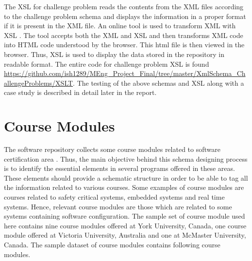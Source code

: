 \documentclass[11pt,letterpaper]{report}
\begin{document}
The XSL for challenge problem reads the contents from the XML files according to the challenge problem schema and displays the information in a proper format if it is present in the XML file. An online tool is used to transform XML with XSL \cite{olXSL}. The tool accepts both the XML and XSL and then transforms XML code into HTML code understood by the browser. This html file is then viewed in the browser. Thus, XSL is used to display the data stored in the repository in readable format. The entire code for challenge problem XSL is found \url{https://github.com/ish1289/MEng_Project_Final/tree/master/XmlSchema_ChallengeProblems/XSLT}.
The testing of the above schemas and XSL along with a case study is described in detail later in the report. 

\chapter{Course Modules}
The software repository collects some course modules related to software certification area \cite{York,Waterloo, MaC,Victoria}. Thus, the main objective behind this schema designing process is to identify the essential elements in several programs offered in these areas. These elements should provide a schematic structure in order to be able to tag all the information related to various courses. Some examples of course modules are courses related to safety critical systems, embedded systems and real time systems. Hence, relevant course modules are those which are related to some systems containing software configuration. The sample set of course module used here contains nine course modules offered at York University, Canada, one course module offered at Victoria University, Australia and one at McMaster University, Canada. The sample dataset of course modules contains following course modules. 
\end{document}
